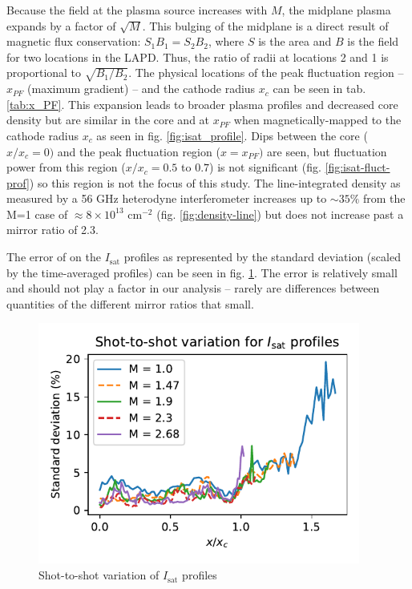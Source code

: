Because the field at the plasma source increases with $M$, the midplane plasma expands by a factor of $\sqrt{M}$. This bulging of the midplane is a direct result of magnetic flux conservation: $S_1 B_1 = S_2 B_2$, where $S$ is the area and $B$ is the field for two locations in the LAPD. Thus, the ratio of radii at locations 2 and 1 is proportional to $\sqrt{B_1/B_2}$. The physical locations of the peak fluctuation region -- $x_{PF}$ (maximum gradient) -- and the cathode radius $x_c$ can be seen in tab. \ref{tab:x_PF}. This expansion leads to broader plasma profiles and decreased core density but are similar in the core and at $x_{PF}$ when magnetically-mapped to the cathode radius $x_c$ as seen in fig. \ref{fig:isat_profile}. Dips between the core ($x/x_c=0)$ and the peak fluctuation region ($x=x_{PF})$ are seen, but fluctuation power from this region ($x/x_c = 0.5$ to $0.7$) is not significant (fig. \ref{fig:isat-fluct-prof}) so this region is not the focus of this study. The line-integrated density as measured by a 56 GHz heterodyne interferometer increases up to $\sim 35\%$ from the M=1 case of $\approx8 \times 10^{13}$ cm$^{-2}$ (fig. \ref{fig:density-line}) but does not increase past a mirror ratio of 2.3.

The error of on the $I_\text{sat}$ profiles as represented by the standard deviation (scaled by the time-averaged profiles) can be seen in fig. \ref{fig_extra:isat-profile-stddev}. The error is relatively small and should not play a factor in our analysis -- rarely are differences between quantities of the different mirror ratios that small.

\begin{figure}
    \centering
    \includegraphics[width=300pt]{figures/extra/isat-profile-stddev.pdf}
    \caption[Shot-to-shot variation of $I_\text{sat}$ profiles]{Shot-to-shot variation of $I_\text{sat}$ profiles}
    \label{fig_extra:isat-profile-stddev}
\end{figure}


